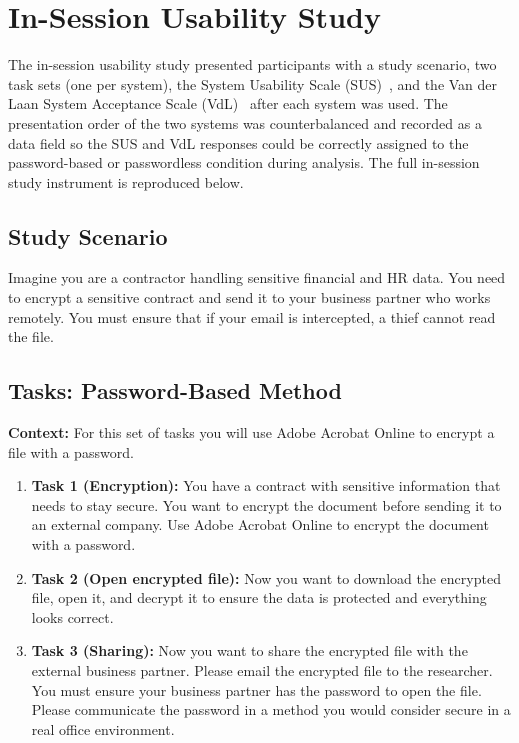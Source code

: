 \section{In-Session Usability Study}
\label{sec:in-session-survey}

The in-session usability study presented participants with a study scenario, two task sets (one per system), the System Usability Scale (SUS)~\cite{brooke_sus_1996}, and the Van der Laan System Acceptance Scale (VdL)~\cite{vanderlaan_simple_1997} after each system was used. The presentation order of the two systems was counterbalanced and recorded as a data field so the SUS and VdL responses could be correctly assigned to the password-based or passwordless condition during analysis. The full in-session study instrument is reproduced below.

\subsection*{Study Scenario}
Imagine you are a contractor handling sensitive financial and HR data. You need to encrypt a sensitive contract and send it to your business partner who works remotely. You must ensure that if your email is intercepted, a thief cannot read the file.

\subsection*{Tasks: Password-Based Method}
\textbf{Context:} For this set of tasks you will use Adobe Acrobat Online to encrypt a file with a password.

\begin{enumerate}
    \item \textbf{Task 1 (Encryption):} You have a contract with sensitive information that needs to stay secure. You want to encrypt the document before sending it to an external company. Use Adobe Acrobat Online to encrypt the document with a password.
    \item \textbf{Task 2 (Open encrypted file):} Now you want to download the encrypted file, open it, and decrypt it to ensure the data is protected and everything looks correct.
    \item \textbf{Task 3 (Sharing):} Now you want to share the encrypted file with the external business partner. Please email the encrypted file to the researcher. You must ensure your business partner has the password to open the file. Please communicate the password in a method you would consider secure in a real office environment.
\end{enumerate}

